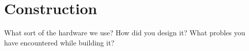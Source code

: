 \section{Construction}
What sort of the hardware we use? How did you design it? What probles you have encountered while building it?
